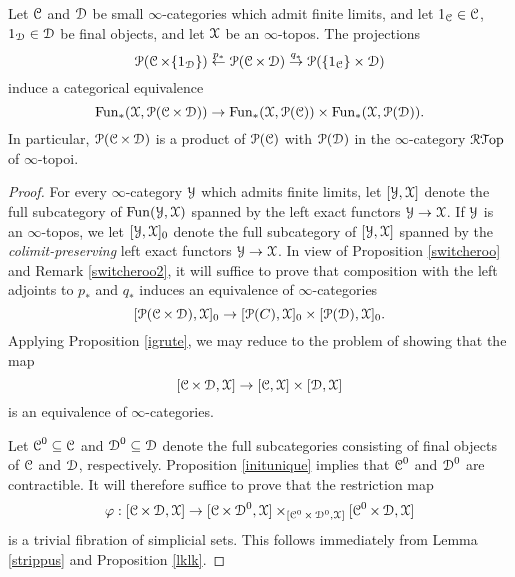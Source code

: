 \begin{lemma}\label{sablesilk}
Let $\calC$ and $\calD$ be small $\infty$-categories which admit finite limits, and let
$1_{\calC} \in \calC$, $1_{\calD} \in \calD$ be final objects, and let $\calX$ be
an $\infty$-topos. The projections
$$ \calP(\calC \times \{1_{\calD} \}) \stackrel{p_{\ast}}{\leftarrow} \calP(\calC \times \calD) \stackrel{q_{\ast}}{\rightarrow} \calP(
\{1_{\calC} \} \times \calD)$$
induce a categorical equivalence
$$ \Fun_{\ast}(\calX, \calP(\calC \times \calD)) \rightarrow \Fun_{\ast}(\calX, \calP(\calC)) \times
\Fun_{\ast}(\calX, \calP(\calD)).$$
In particular, $\calP(\calC \times \calD)$ is a product of $\calP(\calC)$ with
$\calP(\calD)$ in the $\infty$-category $\RGeom$ of $\infty$-topoi.
\end{lemma}

\begin{proof}
For every $\infty$-category $\calY$ which admits finite limits, let
$[\calY,\calX]$ denote the full subcategory of $\Fun(\calY,\calX)$ spanned by the left
exact functors $\calY \rightarrow \calX$. If $\calY$ is an $\infty$-topos, we let
$[\calY, \calX]_0$ denote the full subcategory of $[\calY, \calX]$ spanned by
the {\em colimit-preserving} left exact functors $\calY \rightarrow \calX$. In view of
Proposition \ref{switcheroo} and Remark \ref{switcheroo2}, it will suffice to prove that composition with the left adjoints to
$p_{\ast}$ and $q_{\ast}$ induces an equivalence of $\infty$-categories
$$ [\calP(\calC \times \calD),\calX]_0 \rightarrow [\calP(C),\calX]_0 \times [\calP(\calD),\calX]_0.$$
Applying Proposition \ref{igrute}, we may reduce to the problem of showing that the map
$$ [ \calC \times \calD, \calX] \rightarrow [\calC, \calX] \times [\calD, \calX]$$
is an equivalence of $\infty$-categories. 

Let $\calC^{0} \subseteq \calC$ and $\calD^{0} \subseteq \calD$ denote the full subcategories
consisting of final objects of $\calC$ and $\calD$, respectively. Proposition \ref{initunique}
implies that $\calC^{0}$ and $\calD^{0}$ are contractible. It will therefore suffice to prove
that the restriction map
$$ \phi: [ \calC \times \calD, \calX] \rightarrow [\calC \times \calD^{0}, \calX]
\times_{[ \calC^0 \times \calD^{0}, \calX] } [\calC^{0} \times \calD, \calX]$$
is a trivial fibration of simplicial sets. This follows immediately from
Lemma \ref{strippus} and Proposition \ref{lklk}.
\end{proof}

